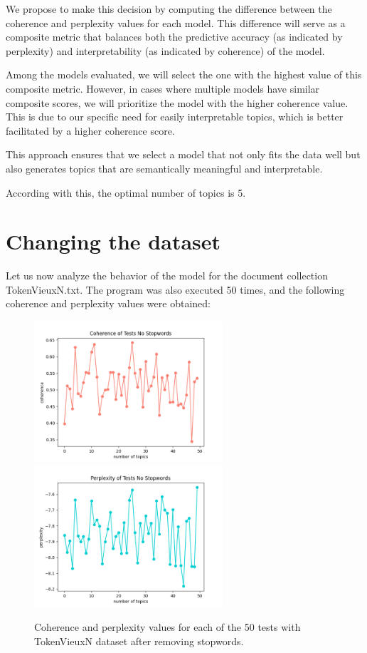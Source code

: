 \documentclass[10pt]{article} %
\begin{document}
	We propose to make this decision by computing the difference between the coherence and perplexity values for each model. This difference will serve as a composite metric that balances both the predictive accuracy (as indicated by perplexity) and interpretability (as indicated by coherence) of the model.
	
	Among the models evaluated, we will select the one with the highest value of this composite metric. However, in cases where multiple models have similar composite scores, we will prioritize the model with the higher coherence value. This is due to our specific need for easily interpretable topics, which is better facilitated by a higher coherence score. 
	
	This approach ensures that we select a model that not only fits the data well but also generates topics that are semantically meaningful and interpretable.
	
	According with this, the optimal number of topics is 5.
	
	\section{Changing the dataset}
	
	Let us now analyze the behavior of the model for the document collection TokenVieuxN.txt. The program was also executed 50 times, and the following coherence and perplexity values were obtained:
	
	\begin{figure}[H]
	\centering
		\includegraphics[width=7cm]{images/coherence_no_stopwords_2}
		\includegraphics[width=7cm]{images/perplexity_no_stopwords_2}
	\caption{Coherence and perplexity values for each of the 50 tests with TokenVieuxN dataset after removing stopwords.}
\end{figure}
	
\end{document}
